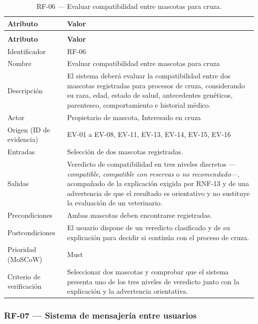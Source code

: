 \documentclass[journal,onecolumn]{IEEEtran}
\makeatletter
\newenvironment{atributos}[2]{%
	\small
	\begin{longtable}{@{}>{\raggedright\arraybackslash}p{4.2cm} >{\raggedright\arraybackslash}p{11.2cm}@{}}
		\caption{#2}\label{tab:#1}\\
		\toprule
		\textbf{Atributo} & \textbf{Valor} \\
		\midrule
		\endfirsthead
		\multicolumn{2}{@{}l}{\small\itshape (continuación)}\\
		\toprule
		\textbf{Atributo} & \textbf{Valor} \\
		\midrule
		\endhead
		\bottomrule
		\endlastfoot
	}{%
	\end{longtable}
	\normalsize
}
\makeatother
\begin{document}
	\begin{atributos}{RF-06}{RF-06 --- Evaluar compatibilidad entre mascotas para cruza.}
		Identificador & RF-06 \\
		Nombre & Evaluar compatibilidad entre mascotas para cruza \\
		Descripción & El sistema deberá evaluar la compatibilidad entre dos mascotas registradas para procesos de cruza, considerando su raza, edad, estado de salud, antecedentes genéticos, parentesco, comportamiento e historial médico. \\
		Actor & Propietario de mascota, Interesado en cruza \\
		Origen (ID de evidencia) & EV-01 a EV-08, EV-11, EV-13, EV-14, EV-15, EV-16 \\
		Entradas & Selección de dos mascotas registradas. \\
		Salidas & Veredicto de compatibilidad en tres niveles discretos --- \emph{compatible}, \emph{compatible con reservas} o \emph{no recomendado}---, acompañado de la explicación exigida por RNF-13 y de una advertencia de que el resultado es orientativo y no sustituye la evaluación de un veterinario. \\
		Precondiciones & Ambas mascotas deben encontrarse registradas. \\
		Postcondiciones & El usuario dispone de un veredicto clasificado y de su explicación para decidir si continúa con el proceso de cruza. \\
		Prioridad (MoSCoW) & Must \\
		Criterio de verificación & Seleccionar dos mascotas y comprobar que el sistema presenta uno de los tres niveles de veredicto junto con la explicación y la advertencia orientativa. \\
	\end{atributos}
	
	
	\subsubsection{RF-07 --- Sistema de mensajería entre usuarios}
	
\end{document}
